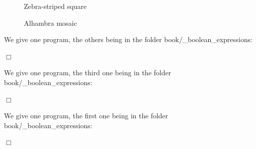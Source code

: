 \begin{figure}[htbp]
 \caption{Zebra-striped square}\label{fig:carzeb}
\end{figure}
\begin{figure}[htbp]
 \caption{Alhambra mosaic}\label{fig:mosaic6}
\end{figure}
\begin{corrige}{
We give one program, the others being in the folder
{\idt book/\_boolean\_expressions}:

\noindent $\Box$}\end{corrige}
\begin{corrige}{
We give one program, the third one being in the folder
{\idt book/\_boolean\_expressions}:

\noindent $\Box$}\end{corrige}
\begin{corrige}{
We give one program, the first one being in the folder
{\idt book/\_boolean\_expressions}:

\noindent $\Box$}\end{corrige}

